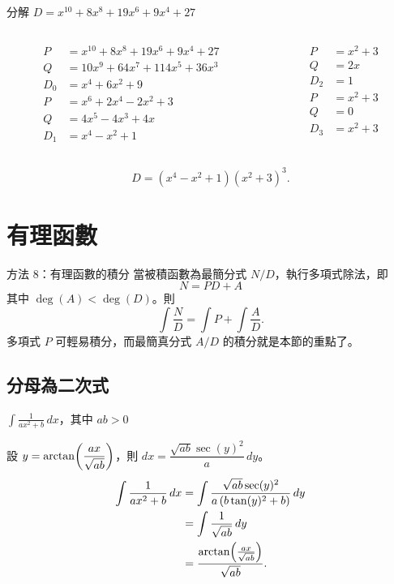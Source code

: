 \documentclass{beamer}
\newcommand{\Left} {\mathopen{}\mathclose\bgroup\left}
\newcommand{\Right}{\aftergroup\egroup\right}
\theoremstyle{remark}
\begin{document}
\begin{CJK}{UTF8}{bsmi}
\begin{frame}{分解 $D = x^{10} + 8x^8 + 19x^6 + 9x^4 + 27$}
  \begin{solution}
    \begin{columns}
      \begin{column}[t]{0.6\textwidth}
	\begin{align*}
	  P   &= x^{10} + 8x^8 + 19x^6 + 9x^4 + 27\\
	  Q   &= 10x^9 + 64x^7 + 114x^5 + 36x^3\\
	  D_0 &= x^4 + 6x^2 + 9\\
	  P   &= x^6 + 2x^4 - 2x^2 + 3\\
	  Q   &= 4x^5 - 4x^3 + 4x\\
	  D_1 &= x^4 - x^2 + 1
	\end{align*}
      \end{column}
      \begin{column}[t]{0.4\textwidth}
	\begin{align*}
	  P   &= x^2 + 3\\
	  Q   &= 2x\\
	  D_2 &= 1\\
	  P   &= x^2 + 3\\
	  Q   &= 0\\
	  D_3 &= x^2 + 3\\
	\end{align*}
      \end{column}
    \end{columns}
    \[D = \left( x^4 - x^2 + 1 \right) \left( x^2 + 3 \right)^3.\]
  \end{solution}
\end{frame}

\section{有理函數}
\begin{frame}{方法 8：有理函數的積分}
  當被積函數為最簡分式 $N/D$，執行多項式除法，即
  \[N = PD + A\]
  其中 $\deg(A) < \deg(D)$。則
  \[\int \frac N D = \int P + \int \frac A D.\]
  多項式 $P$ 可輕易積分，而最簡真分式 $A/D$ 的積分就是本節的重點了。
\end{frame}

\subsection{分母為二次式}
\begin{frame}{$\displaystyle \int \frac{1}{ax^2 + b}\,dx$，其中 $ab > 0$}
  \begin{solution}
    設 $\displaystyle y = \arctan \Left( \frac{ax}{\sqrt{ab}} \Right)$，則 $dx = \dfrac{\sqrt{ab} \sec(y)^2}{a}\,dy$。
    \begin{align*}
      \int \frac{1}{ax^2 + b}\,dx &= \int \frac{\sqrt{ab} \sec(y)^2}{a \left( b \tan(y)^2 + b \right)}\,dy\\
	&= \int \frac{1}{\sqrt{ab}}\,dy\\
	&= \frac{\arctan \Left( \frac{ax}{\sqrt{ab}} \Right)}{\sqrt{ab}}.
    \end{align*}
  \end{solution}
\end{frame}


\end{CJK}
\end{document}

